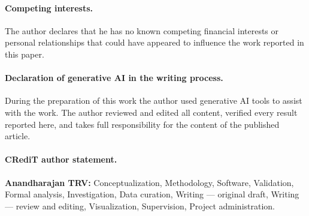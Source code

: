 \paragraph{Competing interests.} The author declares that he has no known
competing financial interests or personal relationships that could have
appeared to influence the work reported in this paper.

\paragraph{Declaration of generative AI in the writing process.} During the
preparation of this work the author used generative AI tools to assist with
the work. The author reviewed and edited all content, verified every result
reported here, and takes full responsibility for the content of the published
article.

\paragraph{CRediT author statement.} \textbf{Anandharajan TRV:}
Conceptualization, Methodology, Software, Validation, Formal analysis,
Investigation, Data curation, Writing --- original draft, Writing --- review
and editing, Visualization, Supervision, Project administration.
